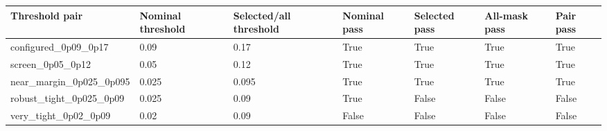\begin{tabular}{lllllll}
\toprule
Threshold pair & Nominal threshold & Selected/all threshold & Nominal pass & Selected pass & All-mask pass & Pair pass \\
\midrule
configured\_0p09\_0p17 & 0.09 & 0.17 & True & True & True & True \\
screen\_0p05\_0p12 & 0.05 & 0.12 & True & True & True & True \\
near\_margin\_0p025\_0p095 & 0.025 & 0.095 & True & True & True & True \\
robust\_tight\_0p025\_0p09 & 0.025 & 0.09 & True & False & False & False \\
very\_tight\_0p02\_0p09 & 0.02 & 0.09 & False & False & False & False \\
\bottomrule
\end{tabular}
